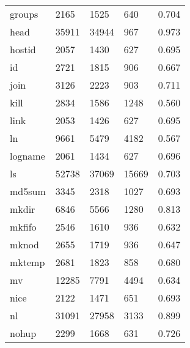 \begin{longtable}{lp{4.5cm}p{4.5cm}p{4.5cm}p{4.5cm}}
groups    &                     2165 &         1525 &           640 &                    0.704 \\
head      &                    35911 &        34944 &           967 &                    0.973 \\
hostid    &                     2057 &         1430 &           627 &                    0.695 \\
id        &                     2721 &         1815 &           906 &                    0.667 \\
join      &                     3126 &         2223 &           903 &                    0.711 \\
kill      &                     2834 &         1586 &          1248 &                    0.560 \\
link      &                     2053 &         1426 &           627 &                    0.695 \\
ln        &                     9661 &         5479 &          4182 &                    0.567 \\
logname   &                     2061 &         1434 &           627 &                    0.696 \\
ls        &                    52738 &        37069 &         15669 &                    0.703 \\
md5sum    &                     3345 &         2318 &          1027 &                    0.693 \\
mkdir     &                     6846 &         5566 &          1280 &                    0.813 \\
mkfifo    &                     2546 &         1610 &           936 &                    0.632 \\
mknod     &                     2655 &         1719 &           936 &                    0.647 \\
mktemp    &                     2681 &         1823 &           858 &                    0.680 \\
mv        &                    12285 &         7791 &          4494 &                    0.634 \\
nice      &                     2122 &         1471 &           651 &                    0.693 \\
nl        &                    31091 &        27958 &          3133 &                    0.899 \\
nohup     &                     2299 &         1668 &           631 &                    0.726 \\

\end{longtable}
